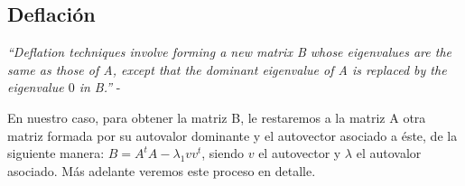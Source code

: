 \subsection{Deflación}

\textit{``Deflation techniques involve forming a new matrix B whose eigenvalues are the same as
  those of A, except that the dominant eigenvalue of A is replaced by the eigenvalue $0$ in B.''} -
\cite[p.~604]{burden}

En nuestro caso, para obtener la matriz B, le restaremos a la matriz A otra matriz formada por su
autovalor dominante y el autovector asociado a éste, de la siguiente manera: $B = A^t A -
\lambda_{1} v v^t $, siendo $v$ el autovector y $\lambda$ el autovalor asociado. Más adelante
veremos este proceso en detalle.
